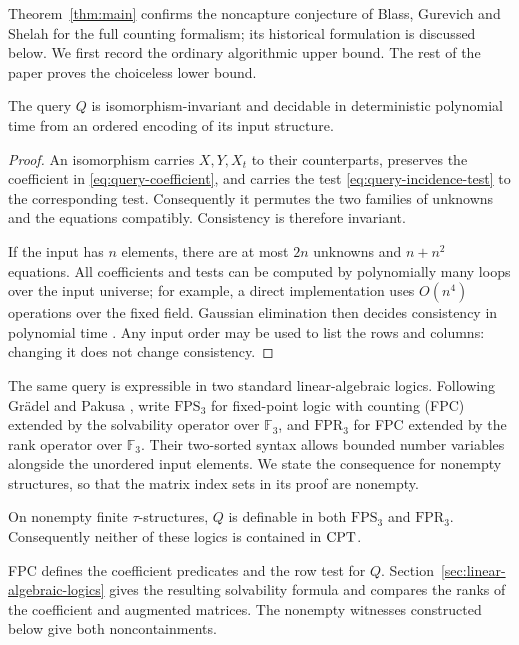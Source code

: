 Theorem~\ref{thm:main} confirms the noncapture conjecture of Blass,
Gurevich and Shelah for the full counting formalism; its historical
formulation is discussed below. We first record the ordinary algorithmic
upper bound. The rest of the paper proves the choiceless lower bound.

\begin{proposition}\label{prop:query-ptime}
The query $Q$ is isomorphism-invariant and decidable in deterministic
polynomial time from an ordered encoding of its input structure.
\end{proposition}
\begin{proof}
An isomorphism carries $X,Y,X_t$ to their counterparts, preserves the
coefficient in \eqref{eq:query-coefficient}, and carries the test
\eqref{eq:query-incidence-test} to the corresponding test.  Consequently it
permutes the two families of unknowns and the equations compatibly.
Consistency is therefore invariant.

If the input has $n$ elements, there are at most $2n$ unknowns and
$n+n^2$ equations.  All coefficients and tests can be computed by
polynomially many loops over the input universe; for example, a direct
implementation uses $O(n^4)$ operations over the fixed field.  Gaussian
elimination then decides consistency in polynomial time
\cite[Sections~14.4--14.5]{shoup2009}. Any input order
may be used to list the rows and columns: changing it does not change
consistency.
\end{proof}

The same query is expressible in two standard linear-algebraic logics.
Following Gr\"adel and Pakusa \cite[Section~2]{graedelPakusa2019}, write
$\mathrm{FPS}_3$ for fixed-point logic with counting (FPC) extended by
the solvability operator over $\mathbb F_3$, and $\mathrm{FPR}_3$ for
FPC extended by the rank operator over $\mathbb F_3$. Their two-sorted syntax
allows bounded number variables alongside the unordered input elements.
We state the consequence for nonempty structures, so that the matrix
index sets in its proof are nonempty.

\begin{corollary}\label{cor:linear-algebraic-logics}
On nonempty finite $\tau$-structures, $Q$ is definable in both
$\mathrm{FPS}_3$ and $\mathrm{FPR}_3$. Consequently neither of these
logics is contained in $\mathrm{CPT}$.
\end{corollary}
FPC defines the coefficient predicates and the row test for $Q$.
Section~\ref{sec:linear-algebraic-logics} gives the resulting solvability
formula and compares the ranks of the coefficient and augmented matrices.
The nonempty witnesses constructed below give both noncontainments.

